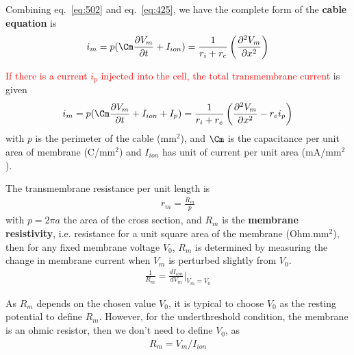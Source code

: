 Combining eq.~\eqref{eq:502} and eq.~\eqref{eq:425}, we have the
complete form of the {\bf cable equation} is
\begin{eqnarray}
\label{eq:430}
  i_m = p(\Cm\frac{\partial V_m}{\partial t} + I_{ion}) =  \frac{1}{r_i+r_e} \left(\frac{\partial^2 V_m}{\partial x^2}\right)
\end{eqnarray}

\textbullet \textcolor{red}{If there is a current $i_p$ injected into the cell,
the total transmembrane current} is given
\begin{eqnarray}
  \label{eq:431}
  i_m = p(\Cm\frac{\partial V_m}{\partial t} + I_{ion} + I_p) =
  \frac{1}{r_i+r_e} \left(\frac{\partial^2 V_m}{\partial x^2} - r_ei_p\right) 
\end{eqnarray}
with $p$ is the perimeter of the cable (mm$^2$), and $\Cm$ is the
capacitance per unit area of membrane (C/mm$^2$) and $I_{ion}$ has
unit of current per unit area (mA/mm$^2$).


The transmembrane resistance per unit length is
\begin{eqnarray}
  \label{eq:455}
  r_m=\frac{R_m}{p}
\end{eqnarray}
with $p=2\pi a$ the area of the cross section, and $R_m$ is the
{\bf membrane resistivity}, i.e. resistance for a unit square area of
the membrane (Ohm.mm$^2$), then for any fixed membrane voltage $V_0$,
$R_m$ is determined by measuring the change in membrane current when
$V_m$ is perturbed slightly from $V_0$.
\begin{eqnarray}
  \label{eq:432}
  \frac{1}{R_m} = \frac{dI_{ion}}{dV_m}|_{V_m=V_0}
\end{eqnarray}

As $R_m$ depends on the chosen value $V_0$, it is typical to choose
$V_0$ as the resting potential to define $R_m$. However, for the
underthreshold condition, the membrane is an ohmic resistor, then we
don't need to define $V_0$, as
\begin{eqnarray}
  \label{eq:434}
  R_m = V_m/I_{ion}
\end{eqnarray}

